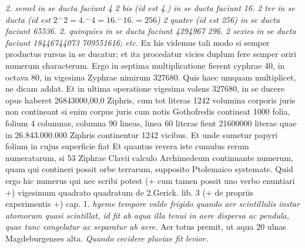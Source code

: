             \pstart \textit{2. semel in se ducta faciunt 4}\pend
            \pstart \textit{2 bis (id est 4.) in se ducta faciunt 16.} \pend
            \pstart \textit{2 ter in se ducta (id est} $2^\smallfrown 2 = 4.^\smallfrown 4 = 16.^\smallfrown 16. =  256$\textit{)} \pend 
            \pstart \textit{2 quater (id est 256) in se ducta faciunt 65536.} \pend
            \pstart \textit{2. quinquies in se ducta faciunt 4294967  296.} \pend 
            \pstart \textit{2 sexies in se ducta faciunt 18446744073 }\textit{ 709551616; etc.} \pend 
            \pstart Ex his videmus tali modo si semper productus rursus  in se ducatur; et ita procedatur vicies  duplum fere semper oriri numerum characterum. Ergo in septima multiplicatione  fierent cyphrae 40, in octava 80, in  vigesima Zyphrae nimirum 327680.  Quis haec umquam multiplicet, ne dicam  addat. Et in ultima operatione vigesima  volens 327680, in se ducere opus haberet  26843000,00,0 Ziphris, cum tot literas 1242  volumina corporis juris non contineant si enim  corpus juris cum notis Gothofredis\protect{} contineat 1000 folia,  folium 4 columnas, columna 90 lineas, linea 60  literas fient 21600000 literae quae in 26.843.000.000 Ziphris continentur 1242 vicibus. Et  unde sumetur papyri folium in cujus superficie fiat  Et quantus revera iste cumulus  rerum numeratarum, si 53 Ziphrae Clavii\protect{} calculo Archimedeum\protect{} continuante numerum, quam  qui contineri possit orbe terrarum, supposito Ptolemaico systemate. Quid ergo hic numerus qui nec  scribi potest (+ cum tamen possit uno verbo enuntiari +)  vigesimum quadrato quadratum de 2.\pend \pstart  Gerick. lib. 3 (+ de propriis experimentis +) cap. 1. \textit{hyeme tempore valde  frigido quando aer scintillulis instar atomorum  quasi scintillat, id fit ab aqua illa tenui in aere  dispersa ac pendula, quae tunc congelatur ac separatur ab aere.}\pend \pstart {} Aer totus premit, ut aqua 20 ulnas  Magdeburgenses alta. \textit{Quando cecidere pluviae fit levior.}\pend 

